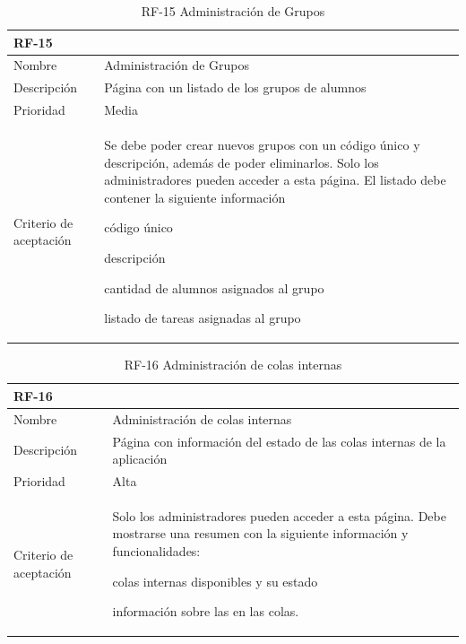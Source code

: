 \documentclass[11pt,spanish,listoffigures,listoftables]{tfgetsinf}
\begin{document}
\begin{table}[ht!]
	\centering
	\begin{tabular}{ |p{4cm}||p{10cm}|  }
		\multicolumn{2}{l}{\textbf{RF-15}} \\
		\hline
		Nombre & Administración de Grupos \\
		\hline
		Descripción & Página con un listado de los \gls{grupo}s de \gls{alumno}s \\
		\hline
		Prioridad & Media\\
		\hline
		Criterio de aceptación & 
		Se debe poder crear nuevos \gls{grupo}s con un código único y descripción, además de poder eliminarlos. \newline
		Solo los \gls{administrador}es pueden acceder a esta página. \newline
		El listado debe contener la siguiente información \newline
		\begin{tabitem}
			\item código único
			\item descripción
			\item cantidad de \gls{alumno}s asignados al \gls{grupo}
			\item listado de \gls{tarea}s asignadas al \gls{grupo}
		\end{tabitem} \\
		\hline
	\end{tabular}
	\caption{RF-15 Administración de Grupos}
	\label{table:15}
\end{table}

\begin{table}[ht!]
	\centering
	\begin{tabular}{ |p{4cm}||p{10cm}|  }
		\multicolumn{2}{l}{\textbf{RF-16}} \\
		\hline
		Nombre & Administración de colas internas \\
		\hline
		Descripción & Página con información del estado de las colas internas de la aplicación \\
		\hline
		Prioridad & Alta\\
		\hline
		Criterio de aceptación & Solo los \gls{administrador}es pueden acceder a esta página. \newline
		Debe mostrarse una resumen con la siguiente información y funcionalidades: \newline
		\begin{tabitem}
			\item colas internas disponibles y su estado
			\item información sobre las \foreign{english}{jobs} en las colas.
		\end{tabitem} \\
		\hline
	\end{tabular}
	\caption{RF-16 Administración de colas internas \\}
	\label{table:16}
\end{table}
\end{document}
